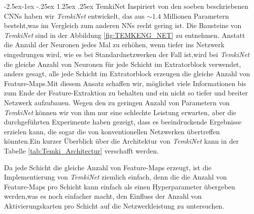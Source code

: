 \documentclass[12pt,a4paper]{scrartcl}
\makeatletter
\numberwithin{equation}{section}
\renewcommand\paragraph{\@startsection{paragraph}{4}{\z@}%
	{-2.5ex\@plus -1ex \@minus -.25ex}%
	{1.25ex \@plus .25ex}%
	{\normalfont\normalsize\bfseries}}
\makeatother
\begin{document}
\paragraph{TemkiNet}\label{exp:TEMKI}
Inspiriert von den soeben beschriebenen \acsp{CNN} haben wir \textit{TemkiNet} entwickelt, das aus $ \sim1.4 $ Millionen Parametern besteht,was im Vergleich zum anderen \acsp{NN} recht gering ist. Die Bausteine von \textit{TemkiNet} sind in der Abbildung \ref{fig:TEMKENG_NET} zu entnehmen.
Anstatt die Anzahl der Neuronen jedes Mal zu erhöhen, wenn tiefer ins Netzwerk eingedrungen wird, wie es bei Standardnetzwerken der Fall ist,wird bei \textit{TemkiNet} die gleiche Anzahl von Neuronen für jede Schicht im Extratorblock verwendet, anders gesagt, alle jede Schicht im Extratorblock erzeugen die gleiche Anzahl von Feature-Maps.Mit diesem Ansatz schaffen wir, möglichst viele Informationen bis zum Ende der Feature-Extraktion zu behalten und ein nicht so tiefer und breiter Netzwerk aufzubauen.
Wegen den zu geringen Anzahl von Parametern von \textit{TemkiNet} können wir von ihm nur eine schlechte Leistung erwarten, aber die durchgeführten Experimente haben gezeigt, dass es beeindruckende Ergebnisse erzielen kann, die sogar die von konventionellen Netzwerken übertreffen könnten.Ein kurzer Überblick über die Architektur von \textit{TemkiNet} kann in der Tabelle \ref{tab:Temki_Architectur} verschafft werden.

Da jede Schicht die gleiche Anzahl von Feature-Maps erzeugt, ist die Implementierung von \textit{TemkiNet} ziemlich einfach, denn die die Anzahl von Feature-Maps pro Schicht kann einfach als einen Hyperparameter übergeben werden,was es noch einfacher macht, den Einfluss der Anzahl von Aktivierungskarten pro Schicht auf die Netzwerkleistung zu untersuchen.
\end{document}

